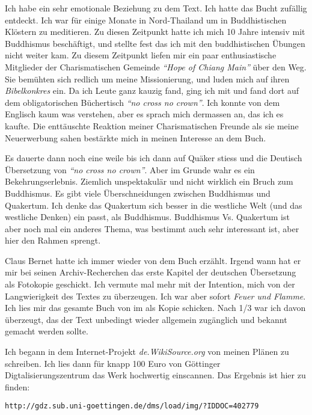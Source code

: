 Ich habe ein sehr emotionale Beziehung zu dem Text. Ich hatte das Bucht zufällig
entdeckt. Ich war für einige Monate in Nord-Thailand um in Buddhistischen
Klöstern zu meditieren. Zu diesen Zeitpunkt hatte ich mich 10 Jahre intensiv mit
Buddhismus beschäftigt, und stellte fest das ich mit den buddhistischen Übungen
nicht weiter kam. Zu diesem Zeitpunkt liefen mir ein paar enthusiastische
Mitglieder der Charismatischen Gemeinde \textit{"`Hope of Chiang Main"'} über
den Weg. Sie bemühten sich redlich um meine Missionierung, und luden mich auf
ihren \textit{Bibelkonkres} ein. Da ich Leute ganz kauzig fand, ging ich mit und
fand dort auf dem obligatorischen Büchertisch \textit{"`no cross no crown"'}.
Ich konnte von dem Englisch kaum was verstehen, aber es sprach mich dermassen
an, das ich es kaufte. Die enttäuschte Reaktion meiner Charismatischen Freunde
als sie meine Neuerwerbung sahen bestärkte mich in meinen Interesse an dem Buch.

\medskip

Es dauerte dann noch eine weile bis ich dann auf Quäker stiess und die Deutisch
Übersetzung von \textit{"`no cross no crown"'}. Aber im Grunde wahr es ein
Bekehrungserlebnis. Ziemlich unspektakulär und nicht wirklich ein Bruch zum
Buddhismus. Es gibt viele Überschneidungen zwischen Buddhismus und Quakertum.
Ich denke das Quakertum sich besser in die westliche Welt (und das westliche
Denken) ein passt, als Buddhismus. Buddhismus Vs. Quakertum ist aber noch mal
ein anderes Thema, was bestimmt auch sehr interessant ist, aber hier den Rahmen
sprengt.

\medskip

Claus Bernet hatte ich immer wieder von dem Buch erzählt. Irgend wann hat er mir
bei seinen Archiv-Recherchen das erste Kapitel der deutschen Übersetzung als
Fotokopie geschickt. Ich vermute mal mehr mit der Intention, mich von der
Langwierigkeit des Textes zu überzeugen. Ich war aber sofort \textit{Feuer und
Flamme}. Ich lies mir das gesamte Buch von im als Kopie schicken. Nach 1/3 war
ich davon überzeugt, das der Text unbedingt wieder allgemein zugänglich und
bekannt gemacht werden sollte.

\medskip

Ich begann in dem Internet-Projekt \textit{de.WikiSource.org} von meinen Plänen
zu schreiben. Ich lies dann für knapp 100 Euro von Göttinger
Digtalisierungszentrum das Werk hochwertig einscannen. Das Ergebnis ist hier zu
finden:

\begin{center}
\texttt{http://gdz.sub.uni-goettingen.de/dms/load/img/?IDDOC=402779}
\end{center}

